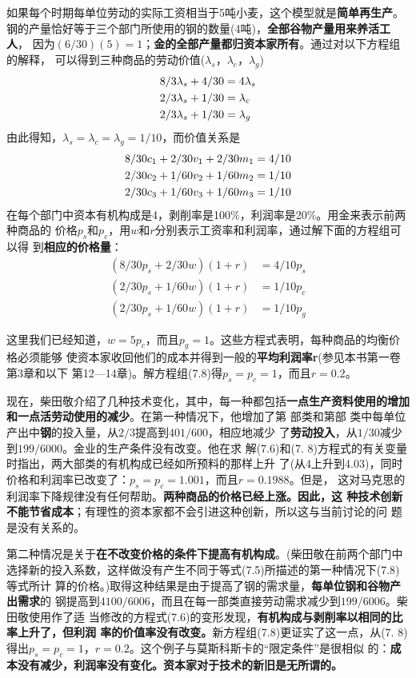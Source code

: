 如果每个时期每单位劳动的实际工资相当于5吨小麦，这个模型就是\textbf{简单再生产}。
钢的产量恰好等于三个部门所使用的钢的数量(4吨)，\textbf{全部谷物产量用来养活工人}，
因为$(6/30)(5)= 1$；\textbf{金的全部产量都归资本家所有}。通过对以下方程组的解释，
可以得到三种商品的劳动价值($\lambda_s，\lambda_c，\lambda_g$)
\begin{align}
8/3 \lambda_s +4/30 &=4 \lambda_s \notag \\
2/3 \lambda_s+1/30 &=\lambda_c \notag \\
2/3 \lambda_s+1/30 &=\lambda_g
\end{align}
由此得知，$\lambda_s=\lambda_c=\lambda_g=1/10$，而价值关系是
\begin{gather}
8/30c_1+2/30v_1+2/30m_1=4/10  \notag \\
2/30c_2+1/60v_2+1/60m_2=1/10  \notag \\
2/30c_3+1/60v_3+1/60m_3=1/10
\end{gather}
在每个部门中资本有机构成是4，剥削率是100\%，利润率是20\%。用金来表示前两种商品的
价格$p_s和p_c$，用$w和r$分别表示工资率和利润率，通过解下面的方程组可以得
到\textbf{相应的价格量}：
\begin{equation}
\begin{aligned}
(8/30p_s+2/30w)(1+r) &=4/10p_s \\
(2/30p_s+1/60w)(1+r) &=1/10p_c \\
(2/30p_s+1/60w)(1+r) &=1/10p_g
\end{aligned}
\end{equation}

这里我们已经知道，$w=5p_c，而且p_g=1$。这些方程式表明，每种商品的均衡价格必须能够
使资本家收回他们的成本并得到一般的\textbf{平均利润率r}(参见本书第一卷第3章和以下
第12—14章)。解方程组(7.8)得$p_s=p_c=1$，而且$r=0.2$。

现在，柴田敬介绍了几种技术变化，其中，每一种都包括\textbf{一点生产资料使用的增加
  和一点活劳动使用的减少}。在第一种情况下，他增加了第 部类和第部
类中每单位产出中\textbf{钢}的投入量，从$2/3$提高到$401/600$，相应地减少
了\textbf{劳动投入}，从$1/30$减少到$199/6000$。金业的生产条件没有改变。他在求
解(7.6)和(7. 8)方程式的有关变量时指出，两大部类的有机构成已经如所预料的那样上升
了(从4上升到4.03)，同时价格和利润率已改变了：$p_s=p_c=1.001，而且r=0.1988$。但是，
这对马克思的利润率下降规律没有任何帮助。\textbf{两种商品的价格已经上涨。因此，这
  种技术创新不能节省成本}；有理性的资本家都不会引进这种创新，所以这与当前讨论的问
题是没有关系的。

第二种情况是关于\textbf{在不改变价格的条件下提高有机构成}。(柴田敬在前两个部门中
选择新的投入系数，这样做没有产生不同于等式(7.5)所描述的第一种情况下(7.8)等式所计
算的价格。)取得这种结果是由于提高了钢的需求量，\textbf{每单位钢和谷物产出需求}的
钢提高到$4100/6006$，而且在每一部类直接劳动需求减少到$199/6006$。柴田敬使用作了适
当修改的方程式(7.6)的变形发现，\textbf{有机构成与剥削率以相同的比率上升了，但利润
  率的价值率没有改变。}新方程组(7.8)更证实了这一点，从(7.
8)得出$p_s=p_c=1，r=0.2$。这个例子与莫斯科斯卡的“限定条件”是很相似
的：\textbf{成本没有减少，利润率没有变化。资本家对于技术的新旧是无所谓的。}

